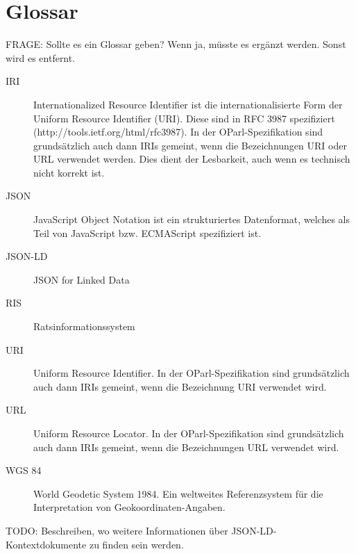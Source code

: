 \documentclass[,a4paper]{article}
\begin{document}
\section{Glossar}\label{glossar}

FRAGE: Sollte es ein Glossar geben? Wenn ja, müsste es ergänzt werden.
Sonst wird es entfernt.

\begin{description}
\item[IRI]
Internationalized Resource Identifier ist die internationalisierte Form
der Uniform Resource Identifier (URI). Diese sind in RFC 3987
spezifiziert (http://tools.ietf.org/html/rfc3987). In der
OParl-Spezifikation sind grundsätzlich auch dann IRIs gemeint, wenn die
Bezeichnungen URI oder URL verwendet werden. Dies dient der Lesbarkeit,
auch wenn es technisch nicht korrekt ist.
\item[JSON]
JavaScript Object Notation ist ein strukturiertes Datenformat, welches
als Teil von JavaScript bzw. ECMAScript spezifiziert ist.
\item[JSON-LD]
JSON for Linked Data
\item[RIS]
Ratsinformationssystem
\item[URI]
Uniform Resource Identifier. In der OParl-Spezifikation sind
grundsätzlich auch dann IRIs gemeint, wenn die Bezeichnung URI verwendet
wird.
\item[URL]
Uniform Resource Locator. In der OParl-Spezifikation sind grundsätzlich
auch dann IRIs gemeint, wenn die Bezeichnungen URL verwendet wird.
\item[WGS 84]
World Geodetic System 1984. Ein weltweites Referenzsystem für die
Interpretation von Geokoordinaten-Angaben.
\end{description}


TODO: Beschreiben, wo weitere Informationen über
JSON-LD-Kontextdokumente zu finden sein werden.
\end{document}
